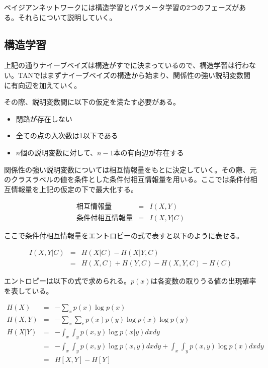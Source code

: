 \documentclass[a4j,12pt]{jarticle}
\begin{document}
ベイジアンネットワークには構造学習とパラメータ学習の2つのフェーズがある。それらについて説明していく。

\subsection{構造学習}

上記の通りナイーブベイズは構造がすでに決まっているので、構造学習は行わない。TANではまずナイーブベイズの構造から始まり、関係性の強い説明変数間に有向辺を加えていく。

その際、説明変数間に以下の仮定を満たす必要がある。

\begin{itemize}
\item 閉路が存在しない

\item 全ての点の入次数は1以下である

\item $n$個の説明変数に対して、$n-1$本の有向辺が存在する
\end{itemize}

関係性の強い説明変数については相互情報量をもとに決定していく。その際、元のクラスラベルの値を条件とした条件付相互情報量を用いる。ここでは条件付相互情報量を上記の仮定の下で最大化する。

\begin{eqnarray*}
\mbox{相互情報量} &=& I(X, Y) \\
\mbox{条件付相互情報量} &=& I(X, Y | C)
\end{eqnarray*}

ここで条件付相互情報量をエントロピーの式で表すと以下のように表せる。

\begin{eqnarray*}
I(X, Y | C) &=& H(X|C) - H(X|Y, C) \\
               &=& H(X, C) + H(Y, C) - H(X, Y, C) - H(C)
\end{eqnarray*}

エントロピーは以下の式で求められる。$p(x)$は各変数の取りうる値の出現確率を表している。

\begin{eqnarray*}
H(X) &=& - \sum_x p(x) \log p(x) \\
H(X, Y) &=& - \sum_x \sum_c p(x) p(y) \log p(x) \log p(y)　\\
H(X| Y) &=& - \int_x \int_y p(x, y) \log p(x| y) dx dy \\
           &=& - \int_x \int_y p(x, y) \log p(x, y) dx dy + \int_x \int_y p(x, y) \log p(x) dx dy \\
           &=& H[X, Y] - H[Y] 
\end{eqnarray*}
\end{document}
